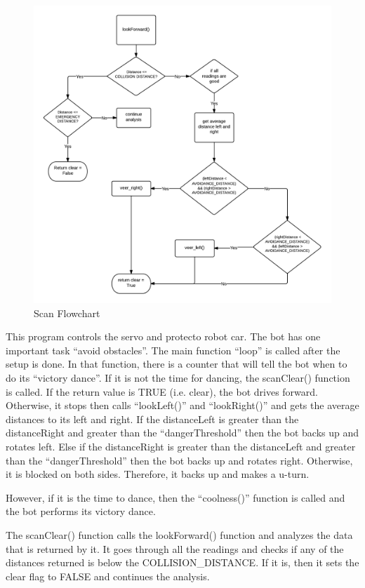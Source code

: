 \documentclass[11pt]{article}
\begin{document}
	\begin{figure}[h]\centering
	\includegraphics[height=0.85\textwidth]{images/scan_clear.png}
	\caption{Scan Flowchart}
		\label{scan}
	\end{figure}
\par
This program controls the servo and protecto robot car. The bot has one important task ``avoid obstacles''. The main function ``loop'' is called after the setup is done. In that function, there is a counter that will tell the bot when to do its ``victory dance''. If it is not the time for dancing, the scanClear() function is called. If the return value is TRUE (i.e. clear), the bot drives forward. Otherwise, it stops then calls ``lookLeft()'' and ``lookRight()'' and gets the average distances to its left and right. If the distanceLeft is greater than the distanceRight and greater than the ``dangerThreshold'' then the bot backs up and rotates left. Else if the distanceRight is greater than the distanceLeft and greater than the ``dangerThreshold'' then the bot backs up and rotates right. Otherwise, it is blocked on both sides. Therefore, it backs up and makes a u-turn.

% 
However, if it is the time to dance, then the ``coolness()'' function is called and the bot performs its victory dance.

The scanClear() function calls the lookForward() function and analyzes the data that is returned by it. It goes through all the readings and checks if any of the distances returned is below the COLLISION\_DISTANCE. If it is, then it sets the clear flag to FALSE and continues the analysis.
\end{document}

